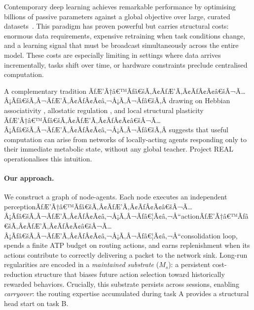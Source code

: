 \documentclass[10pt,twocolumn]{article}
\newcommand{\Ms}{M_s}
\begin{document}
Contemporary deep learning achieves remarkable performance by optimising
billions of passive parameters against a global objective over large, curated
datasets~\citep{lecun2015deep}.
This paradigm has proven powerful but carries structural costs: enormous data
requirements, expensive retraining when task conditions change, and a learning
signal that must be broadcast simultaneously across the entire model.
These costs are especially limiting in settings where data arrives incrementally,
tasks shift over time, or hardware constraints preclude centralised computation.

A complementary tradition ÃƒÆ’Ã†â€™Ãƒâ€šÃ‚Â¢ÃƒÆ’Ã‚Â¢ÃƒÂ¢Ã¢â€šÂ¬Ã…Â¡Ãƒâ€šÃ‚Â¬ÃƒÆ’Ã‚Â¢ÃƒÂ¢Ã¢â‚¬Å¡Ã‚Â¬Ãƒâ€šÃ‚Â drawing on Hebbian associativity
\citep{hebb1949organization}, allostatic regulation
\citep{sterling2012allostasis}, and local structural plasticity
\citep{bhatt2009dendritic} ÃƒÆ’Ã†â€™Ãƒâ€šÃ‚Â¢ÃƒÆ’Ã‚Â¢ÃƒÂ¢Ã¢â€šÂ¬Ã…Â¡Ãƒâ€šÃ‚Â¬ÃƒÆ’Ã‚Â¢ÃƒÂ¢Ã¢â‚¬Å¡Ã‚Â¬Ãƒâ€šÃ‚Â suggests that useful computation can arise from
networks of locally-acting agents responding only to their immediate metabolic
state, without any global teacher.
Project REAL operationalises this intuition.

\paragraph{Our approach.}
We construct a graph of node-agents.
Each node executes an independent perceptionÃƒÆ’Ã†â€™Ãƒâ€šÃ‚Â¢ÃƒÆ’Ã‚Â¢ÃƒÂ¢Ã¢â€šÂ¬Ã…Â¡Ãƒâ€šÃ‚Â¬ÃƒÆ’Ã‚Â¢ÃƒÂ¢Ã¢â‚¬Å¡Ã‚Â¬Ãƒâ€¦Ã¢â‚¬Å“actionÃƒÆ’Ã†â€™Ãƒâ€šÃ‚Â¢ÃƒÆ’Ã‚Â¢ÃƒÂ¢Ã¢â€šÂ¬Ã…Â¡Ãƒâ€šÃ‚Â¬ÃƒÆ’Ã‚Â¢ÃƒÂ¢Ã¢â‚¬Å¡Ã‚Â¬Ãƒâ€¦Ã¢â‚¬Å“consolidation loop, spends
a finite ATP budget on routing actions, and earns replenishment when its actions
contribute to correctly delivering a packet to the network sink.
Long-run regularities are encoded in a \emph{maintained substrate} ($\Ms$): a
persistent cost-reduction structure that biases future action selection toward
historically rewarded behaviors.
Crucially, this substrate persists across sessions, enabling \emph{carryover}:
the routing expertise accumulated during task A provides a structural head start
on task B.
\end{document}
